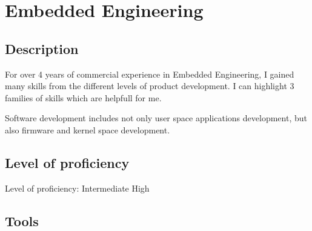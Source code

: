 \section{Embedded Engineering}

\subsection{Description}

For over 4 years of commercial experience in Embedded Engineering,
I gained many skills from the different levels of product development. I can
highlight 3 families of skills which are helpfull for me.

Software development includes not only user space applications development,
but also firmware and kernel space development.

\subsection{Level of proficiency}

Level of proficiency: Intermediate High

\subsection{Tools}

